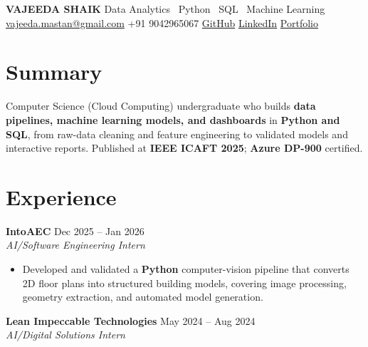 \documentclass[11pt]{extarticle}
\begin{document}

\noindent
{\LARGE\textbf{VAJEEDA SHAIK}}
\hfill
Data Analytics \textbar\ Python \textbar\ SQL \textbar\ Machine Learning
\\[4pt]

\small
\faEnvelope\;
\href{mailto:vajeeda.mastan@gmail.com}{vajeeda.mastan@gmail.com}
\quad\textbar\quad
\faPhone\; +91 9042965067
\quad\textbar\quad
\faGithub\;
\href{https://github.com/vajeedashaik}{GitHub}
\quad\textbar\quad
\faLinkedin\;
\href{https://www.linkedin.com/in/vajeeda-shaik-344774279}{LinkedIn}
\quad\textbar\quad
\faGlobe\;
\href{https://shaikvajeeda-portfolio.vercel.app}{Portfolio}

\normalsize


\section*{Summary}

Computer Science (Cloud Computing) undergraduate who builds
\textbf{data pipelines, machine learning models, and dashboards} in
\textbf{Python and SQL}, from raw-data cleaning and feature engineering to validated
models and interactive reports. Published at \textbf{IEEE ICAFT 2025}; \textbf{Azure DP-900} certified.


\section*{Experience}

\textbf{IntoAEC} \hfill Dec 2025 -- Jan 2026 \\
\textit{AI/Software Engineering Intern}

\begin{itemize}
    \item Developed and validated a \textbf{Python} computer-vision pipeline that converts 2D floor plans into structured building models, covering image processing, geometry extraction, and automated model generation.
\end{itemize}

\vspace{3pt}

\textbf{Lean Impeccable Technologies} \hfill May 2024 -- Aug 2024 \\
\textit{AI/Digital Solutions Intern}
\end{document}
